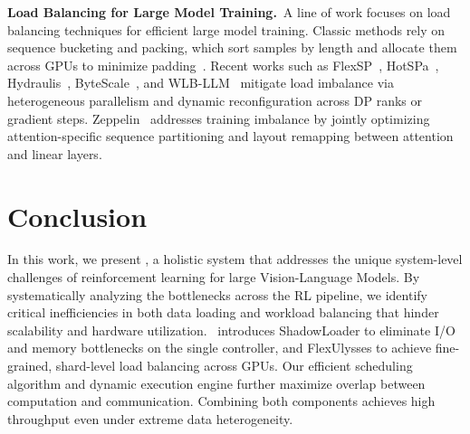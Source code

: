 \noindent\textbf{Load Balancing for Large Model Training.}~A line of work focuses on load balancing techniques for efficient large model training. Classic methods rely on sequence bucketing and packing, which sort samples by length and allocate them across GPUs to minimize padding~\citep{KimiVL,KeyeVL,GLM-4_5V,InternVL3_5}. Recent works such as FlexSP~\citep{FlexSP}, HotSPa~\citep{HotSPa}, Hydraulis~\citep{Hydraulis}, ByteScale~\citep{ByteScale}, and WLB-LLM~\citep{WLB-LLM} mitigate load imbalance via heterogeneous parallelism and dynamic reconfiguration across DP ranks or gradient steps. Zeppelin~\citep{Zeppelin} addresses training imbalance by jointly optimizing attention-specific sequence partitioning and layout remapping between attention and linear layers.

\section{Conclusion}
\label{sec_discussion}

In this work, we present \SysName, a holistic system that addresses the unique system-level challenges of reinforcement learning for large Vision-Language Models. By systematically analyzing the bottlenecks across the RL pipeline, we identify critical inefficiencies in both data loading and workload balancing that hinder scalability and hardware utilization. \SysName~introduces ShadowLoader to eliminate I/O and memory bottlenecks on the single controller, and FlexUlysses to achieve fine-grained, shard-level load balancing across GPUs. Our efficient scheduling algorithm and dynamic execution engine further maximize overlap between computation and communication. Combining both components achieves high throughput even under extreme data heterogeneity.



